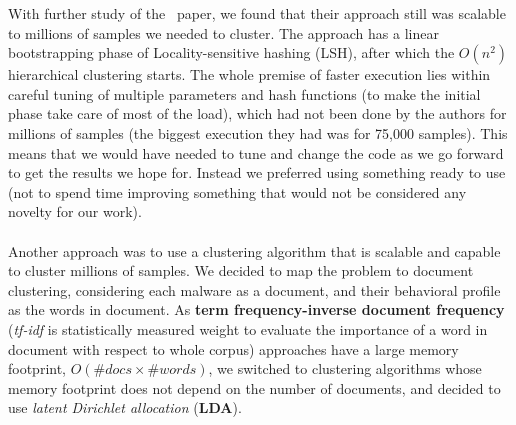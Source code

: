 With further study of the~\cite[Bayer]{bayer} paper, we found that their approach still was scalable to millions of samples we needed to cluster.
The approach has a linear bootstrapping phase of Locality-sensitive hashing (LSH), after which the $O(n^2)$ hierarchical clustering starts.
The whole premise of faster execution lies within careful tuning of multiple parameters and hash functions (to make the initial phase take care of most of the load), which had not been done by the authors for millions of samples (the biggest execution they had was for 75,000 samples).
This means that we would have needed to tune and change the code as we go forward to get the results we hope for.
Instead we preferred using something ready to use (not to spend time improving something that would not be considered any novelty for our work).
\\
\\
Another approach was to use a clustering algorithm that is scalable and capable to cluster millions of samples.
We decided to map the problem to document clustering, considering each malware as a document, and their behavioral profile as the words in document.
As \textbf{term frequency-inverse document frequency} (\emph{tf-idf} is statistically measured weight to evaluate the importance of a word in document with respect to whole corpus) approaches have a large memory footprint, $O(\#docs \times \#words)$, we switched to clustering algorithms whose memory footprint does not depend on the number of documents, and decided to use \textit{latent Dirichlet allocation} (\textbf{LDA}).
\\
